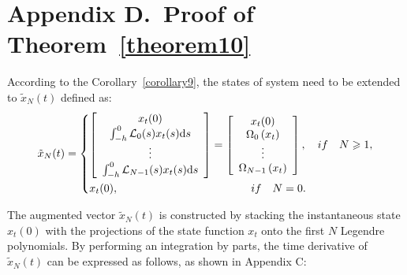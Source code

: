 \documentclass[a4paper]{cas-sc}
\begin{document}
\section*{Appendix D.~Proof of Theorem~\ref{theorem10}}
\label{AppendixD}
According to the Corollary~\ref{corollary9}, the states of system need to be extended to ${\tilde x_N}(t)$ defined as:
\begin{equation}
  {\tilde x_N}(t) = \left\{ \begin{gathered}
    \left[ {\begin{array}{*{20}{c}}
            {{x_t}(0)}                                               \\
            {\int_{ - h}^0 {{\mathcal{L}_0}} (s){x_t}(s){\text{d}}s} \\
            \vdots                                                   \\
            {\int_{ - h}^0 {{\mathcal{L}_{N - 1}}} (s){x_t}(s){\text{d}}s}
          \end{array}} \right] = \left[ {\begin{array}{*{20}{c}}
            {{x_t}(0)}                          \\
            {{\Omega _0}\left( {{x_t}} \right)} \\
            \vdots                              \\
            {{\Omega _{N - 1}}\left( {{x_t}} \right)}
          \end{array}} \right],\quad if\quad N \geqslant 1, \hfill \\
    {x_t}(0),\quad \quad \quad \quad \quad \quad \quad \quad \quad \quad \quad \quad if\quad N = 0. \hfill \\
  \end{gathered}  \right.
  \label{DX}
\end{equation}

The augmented vector ${\tilde x_N}(t)$ is constructed by stacking the instantaneous state ${x_t}(0)$ with the projections of the state function $ {x_t}$ onto the first $N$ Legendre polynomials. By performing an integration by parts, the time derivative of ${\tilde x_N}(t)$ can be expressed as follows, as shown in Appendix C:
\end{document}
